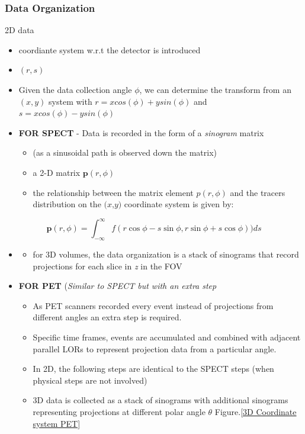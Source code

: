 \documentclass{article}
\begin{document}
\subsubsection{Data Organization}
2D data
\begin{itemize}
\item coordiante system w.r.t the detector is introduced
\item $(r,s)$
\item Given the data collection angle $\phi$, we can determine the transform from an $(x,y)$ system with $ r = x cos(\phi) + y sin(\phi) $ and $ s = x cos(\phi) - y sin(\phi) $
\item  \textbf{FOR SPECT} - Data is recorded in the form of a \textit{sinogram} matrix
\begin{itemize}
\item (as a sinusoidal path is observed down the matrix) 
\item a 2-D matrix $\textbf{p}(r,\phi)$   
\item the relationship between the matrix element 
$p(r,\phi)$
and the tracers distribution on the 
$\textit{(x,y)}$
coordinate system is given by:
\end{itemize}
\end{itemize}
\[  
\textbf{p}(r,\phi) = 
\int _{-\infty}^{\infty} 
    f(
        r\cos\phi - s\sin\phi, 
        r\sin\phi + s\cos\phi)
    )ds
\]
\begin{itemize}
\item 
\begin{itemize}
\item for 3D volumes, the data organization is a stack of sinograms that record projections for each slice in \textit{z} in the FOV
\end{itemize}
\item \textbf{FOR PET} (\textit{Similar to SPECT but with an extra step}
\begin{itemize}
\item As PET scanners recorded every event instead of projections from different angles an extra step is required.
\item Specific time frames, events are accumulated and combined with adjacent parallel LORs to represent projection data from a particular angle.
\item In 2D, the following steps are identical to the SPECT steps (when physical steps are not involved)
\item 3D data is collected as a stack of sinograms with additional sinograms representing projections at different polar angle $\theta$  Figure.\ref{3D Coordinate system PET}
\end{itemize}
\end{itemize}
\end{document}
